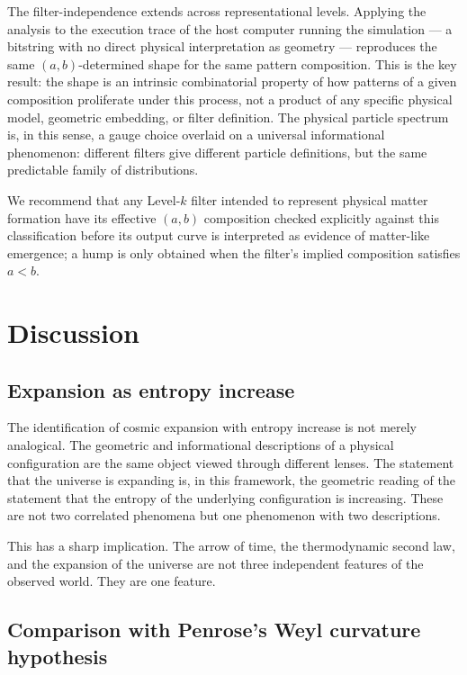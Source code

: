 \documentclass[11pt]{article}
\begin{document}
The filter-independence extends across representational levels. Applying the analysis to the execution
trace of the host computer running the simulation --- a bitstring with no direct physical interpretation as
geometry --- reproduces the same $(a,b)$-determined shape for the same pattern composition. This is the key
result: the shape is an intrinsic combinatorial property of how patterns of a given composition proliferate
under this process, not a product of any specific physical model, geometric embedding, or filter definition.
The physical particle spectrum is, in this sense, a gauge choice overlaid on a universal informational
phenomenon: different filters give different particle definitions, but the same predictable family of
distributions.

We recommend that any Level-$k$ filter intended to represent physical matter formation have its effective
$(a,b)$ composition checked explicitly against this classification before its output curve is interpreted as
evidence of matter-like emergence; a hump is only obtained when the filter's implied composition satisfies
$a<b$.

\section{Discussion}
\label{sec:discussion}

\subsection{Expansion as entropy increase}

The identification of cosmic expansion with entropy increase is not merely
analogical. The geometric and informational
descriptions of a physical configuration are the same object viewed through
different lenses. The statement that the universe is expanding is, in this
framework, the geometric reading of the statement that the entropy of the
underlying configuration is increasing. These are not two correlated
phenomena but one phenomenon with two descriptions.

This has a sharp implication. The arrow of time, the thermodynamic second
law, and the expansion of the universe are not three independent features of
the observed world. They are one feature.


\subsection{Comparison with Penrose's Weyl curvature hypothesis}
\end{document}
